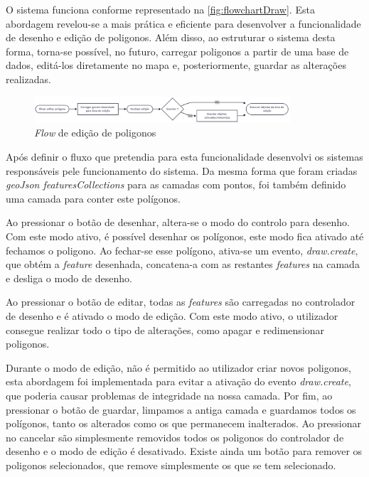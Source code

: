 
O sistema funciona conforme representado na \autoref{fig:flowchartDraw}. Esta abordagem revelou-se a mais prática e eficiente para desenvolver a funcionalidade de desenho e edição de poligonos. Além disso, ao estruturar o sistema desta forma, torna-se possível, no futuro, carregar poligonos a partir de uma base de dados, editá-los diretamente no mapa e, posteriormente, guardar as alterações realizadas.

\begin{figure}[h!]
    \centering
    \includegraphics[width=0.85\textwidth]{figs/flowchart_draw.png}
    \caption{\textit{Flow} de edição de poligonos}
    \label{fig:flowchartDraw}
\end{figure}

Após definir o fluxo que pretendia para esta funcionalidade desenvolvi os sistemas responsáveis pele funcionamento do sistema. Da mesma forma que foram criadas \textit{geoJson featuresCollections} para as camadas com pontos, foi também definido uma camada para conter este polígonos.

Ao pressionar o botão de desenhar, altera-se o modo do controlo para desenho. Com este modo ativo, é possível desenhar os polígonos, este modo fica ativado até fechamos o poligono. Ao fechar-se esse polígono, ativa-se um evento, \textit{draw.create}, que obtém a \textit{feature} desenhada, concatena-a com as restantes \textit{features} na camada e desliga o modo de desenho.

Ao pressionar o botão de editar, todas as \textit{features} são carregadas no controlador de desenho e é ativado o modo de edição. Com este modo ativo, o utilizador consegue realizar todo o tipo de alterações, como apagar e redimensionar poligonos. 

Durante o modo de edição, não é permitido ao utilizador criar novos poligonos, esta abordagem foi implementada para evitar a ativação do evento \textit{draw.create}, que poderia causar problemas de integridade na nossa camada. Por fim, ao pressionar o botão de guardar, limpamos a antiga camada e guardamos todos os polígonos, tanto os alterados como os que permanecem inalterados. Ao pressionar no cancelar são simplesmente removidos todos os poligonos do controlador de desenho e o modo de edição é desativado. Existe ainda um botão para remover os poligonos selecionados, que remove simplesmente os que se tem selecionado.

